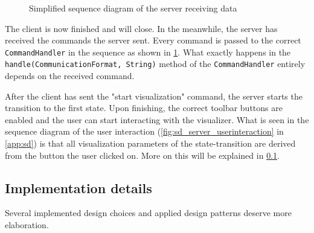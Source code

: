 \documentclass[a4paper]{article}
\begin{document}
\begin{figure}[ht]
  \centering
  \caption{Simplified sequence diagram of the server receiving data}
  \label{fig:sd_server_receivecommand}
\end{figure}
The client is now finished and will close. In the meanwhile, the server has received the commands the server sent. Every command is passed to the correct \lstinline{CommandHandler} in the sequence as shown in \cref{fig:sd_server_receivecommand}. What exactly happens in the \lstinline{handle(CommunicationFormat, String)} method of the \lstinline{CommandHandler} entirely depends on the received command.

After the client has sent the "start visualization" command, the server starts the transition to the first state. Upon finishing, the correct toolbar buttons are enabled and the user can start interacting with the visualizer. What is seen in the sequence diagram of the user interaction (\cref{fig:sd_server_userinteraction} in \cref{app:sd}) is that all visualization parameters of the state-transition are derived from the button the user clicked on. More on this will be explained in \cref{subsec:implementationdetails}.


\subsection{Implementation details}\label{subsec:implementationdetails}
Several implemented design choices and applied design patterns deserve more elaboration.
\end{document}
